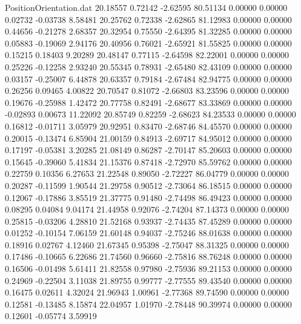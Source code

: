 \begin{filecontents}{PositionOrientation.dat}
  20.18557    0.72142   -2.62595    80.51134    0.00000    0.00000    0.02732   -0.03738    8.58481
  20.25762    0.72338   -2.62865    81.12983    0.00000    0.00000    0.44656   -0.21278    2.68357
  20.32954    0.75550   -2.64395    81.32285    0.00000    0.00000    0.05883   -0.19069    2.94176
  20.40956    0.76021   -2.65921    81.55825    0.00000    0.00000    0.15215    0.18403    9.20289
  20.48147    0.77115   -2.64598    82.22001    0.00000    0.00000    0.25226   -0.12258    2.93240
  20.55345    0.78931   -2.65480    82.43109    0.00000    0.00000    0.03157   -0.25007    6.44878
  20.63357    0.79184   -2.67484    82.94775    0.00000    0.00000    0.26256    0.09465    4.00822
  20.70547    0.81072   -2.66803    83.23596    0.00000    0.00000    0.19676   -0.25988    1.42472
  20.77758    0.82491   -2.68677    83.33869    0.00000    0.00000   -0.02893    0.00673   11.22092
  20.85749    0.82259   -2.68623    84.23533    0.00000    0.00000    0.16812   -0.01711    3.05979
  20.92951    0.83470   -2.68746    84.45570    0.00000    0.00000    0.20015   -0.13474    6.85904
  21.00159    0.84913   -2.69717    84.95012    0.00000    0.00000    0.17197   -0.05381    3.20285
  21.08149    0.86287   -2.70147    85.20603    0.00000    0.00000    0.15645   -0.39060    5.41834
  21.15376    0.87418   -2.72970    85.59762    0.00000    0.00000    0.22759    0.10356    6.27653
  21.22548    0.89050   -2.72227    86.04779    0.00000    0.00000    0.20287   -0.11599    1.90544
  21.29758    0.90512   -2.73064    86.18515    0.00000    0.00000    0.12067   -0.17886    3.85519
  21.37775    0.91480   -2.74498    86.49423    0.00000    0.00000    0.08295    0.04084    9.04174
  21.44958    0.92076   -2.74204    87.14373    0.00000    0.00000    0.25815   -0.03206    4.28810
  21.52168    0.93937   -2.74435    87.45289    0.00000    0.00000    0.01252   -0.10154    7.06159
  21.60148    0.94037   -2.75246    88.01638    0.00000    0.00000    0.18916    0.02767    4.12460
  21.67345    0.95398   -2.75047    88.31325    0.00000    0.00000    0.17486   -0.10665    6.22686
  21.74560    0.96660   -2.75816    88.76248    0.00000    0.00000    0.16506   -0.01498    5.61411
  21.82558    0.97980   -2.75936    89.21153    0.00000    0.00000    0.24969   -0.22504    3.11038
  21.89755    0.99777   -2.77555    89.43540    0.00000    0.00000    0.16475    0.02611    4.32024
  21.96943    1.00961   -2.77368    89.74590    0.00000    0.00000    0.12581   -0.13485    8.15874
  22.04957    1.01970   -2.78448    90.39974    0.00000    0.00000    0.12601   -0.05774    3.59919

\end{filecontents}
